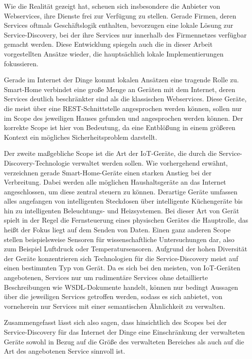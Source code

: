 \documentclass[conference,compsoc]{IEEEtran}
\begin{document}
Wie die Realität gezeigt hat, scheuen sich insbesondere die Anbieter von Webservices, ihre Dienste frei zur Verfügung zu stellen. Gerade Firmen, deren Services oftmals Geschäftslogik enthalten, bevorzugen eine lokale Lösung zur Service-Discovery, bei der ihre Services nur innerhalb des Firmennetzes verfügbar gemacht werden. Diese Entwicklung spiegeln auch die in dieser Arbeit vorgestellten Ansätze wieder, die hauptsächlich lokale Implementierungen fokussieren.

Gerade im Internet der Dinge kommt lokalen Ansätzen eine tragende Rolle zu. Smart-Home verbindet eine große Menge an Geräten mit dem Internet, deren Services deutlich beschränkter sind als die klassischen Webservices. Diese Geräte, die meist über eine REST-Schnittstelle angesprochen werden können, sollen nur im Scope des jeweiligen Hauses gefunden und angesprochen werden können. Der korrekte Scope ist hier von Bedeutung, da eine Entblößung in einem größeren Kontext ein mögliches Sicherheitsproblem darstellt.

Der zweite maßgebliche Scope ist die Art der IoT-Geräte, die durch die Service-Discovery-Technologie verwaltet werden sollen. Wie vorhergehend erwähnt, verzeichnen gerade Smart-Home-Geräte einen starken Anstieg bei der Verbreitung. Dabei werden alle möglichen Haushaltsgeräte an das Internet angeschlossen, um diese zentral steuern zu können. Derartige Geräte umfassen alles angefangen von intelligenten Steckdosen über intelligente Küchengeräte bis hin zu intelligenten Beleuchtungs- und Heizsystemen. Bei dieser Art von Gerät spielt in der Regel die Fernsteuerung eines physischen Gerätes die Hauptrolle, das heißt der Fokus liegt auf dem Senden von Daten. Einen ganz anderen Scope stellen beispielsweise Sensoren für wissenschaftliche Untersuchungen dar, also zum Beispiel Luftdruck oder Temperatursensoren. Aufgrund der hohen Diversität der Geräte konzentrieren sich Technologien für die Service-Discovery meist auf einen bestimmten Typ von Gerät. Da es sich bei den meisten, von IoT-Geräten angebotenen, Services nur um rudimentäre Services ohne detaillierte Beschreibungen wie WSDL-Dokumente handelt, können nur bedingt Aussagen über die jeweiligen Services getroffen werden, sodass es sich anbietet, von vorneherein nur Services mit einer semantischen Ähnlichkeit zu verwalten.

Zusammengefasst lässt sich also sagen, dass hinsichtlich des Scopes bei der Service-Discovery für das Internet der Dinge eine Einschränkung der verwalteten Geräte sowohl in Bezug auf die Größe des verwalteten Bereiches als auch auf die Art des angebotenen Service sinnvoll ist.
\end{document}
